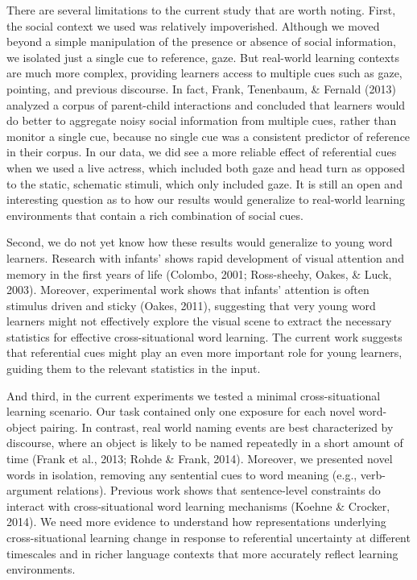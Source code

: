\documentclass[authoryear, review]{elsarticle}
\begin{document}
There are several limitations to the current study that are worth
noting. First, the social context we used was relatively impoverished.
Although we moved beyond a simple manipulation of the presence or
absence of social information, we isolated just a single cue to
reference, gaze. But real-world learning contexts are much more complex,
providing learners access to multiple cues such as gaze, pointing, and
previous discourse. In fact, Frank, Tenenbaum, \& Fernald (2013)
analyzed a corpus of parent-child interactions and concluded that
learners would do better to aggregate noisy social information from
multiple cues, rather than monitor a single cue, because no single cue
was a consistent predictor of reference in their corpus. In our data, we
did see a more reliable effect of referential cues when we used a live
actress, which included both gaze and head turn as opposed to the
static, schematic stimuli, which only included gaze. It is still an open
and interesting question as to how our results would generalize to
real-world learning environments that contain a rich combination of
social cues.

Second, we do not yet know how these results would generalize to young
word learners. Research with infants' shows rapid development of visual
attention and memory in the first years of life (Colombo, 2001;
Ross-sheehy, Oakes, \& Luck, 2003). Moreover, experimental work shows
that infants' attention is often stimulus driven and sticky (Oakes,
2011), suggesting that very young word learners might not effectively
explore the visual scene to extract the necessary statistics for
effective cross-situational word learning. The current work suggests
that referential cues might play an even more important role for young
learners, guiding them to the relevant statistics in the input.

And third, in the current experiments we tested a minimal
cross-situational learning scenario. Our task contained only one
exposure for each novel word-object pairing. In contrast, real world
naming events are best characterized by discourse, where an object is
likely to be named repeatedly in a short amount of time (Frank et al.,
2013; Rohde \& Frank, 2014). Moreover, we presented novel words in
isolation, removing any sentential cues to word meaning (e.g.,
verb-argument relations). Previous work shows that sentence-level
constraints do interact with cross-situational word learning mechanisms
(Koehne \& Crocker, 2014). We need more evidence to understand how
representations underlying cross-situational learning change in response
to referential uncertainty at different timescales and in richer
language contexts that more accurately reflect learning environments.
\end{document}
